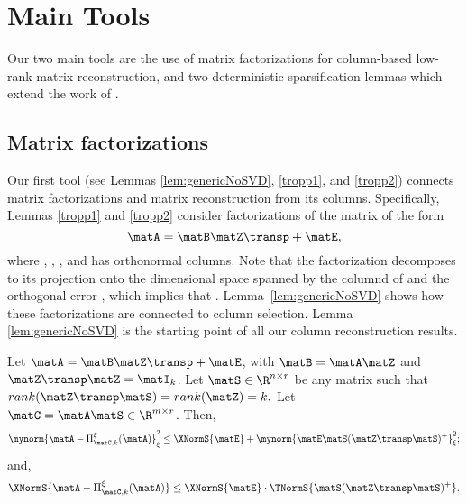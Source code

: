 \section{Main Tools}\label{sec:main1}
Our two main tools are the use of matrix factorizations for
column-based low-rank matrix reconstruction, and two
deterministic sparsification lemmas which extend the work of
\cite{BSS09}.

\subsection{Matrix factorizations}\label{sec:generic}

Our first tool (see Lemmas \ref{lem:genericNoSVD}, \ref{tropp1}, and \ref{tropp2}) connects matrix factorizations and matrix reconstruction from its columns.
Specifically, Lemmas \ref{tropp1} and \ref{tropp2} consider factorizations of
the matrix  of the form
$$\matA=\matB\matZ\transp+\matE,$$
where
,
, ,
and \math{\matZ} has orthonormal columns.
Note that the factorization decomposes \math{\matA} to its projection
\math{\matA\matZ\matZ\transp} onto the  dimensional space
spanned by the columnd of \math{\matZ} and the
 orthogonal error \math{\matE=\matA(\matI-\matZ\matZ\transp)}, which implies
 that
.
Lemma~\ref{lem:genericNoSVD} shows how these
factorizations are connected to column selection.
Lemma \ref{lem:genericNoSVD} is the starting point of all our
column reconstruction results.
\begin{lemma}
\label{lem:genericNoSVD}
Let $\matA = \matB \matZ\transp + \matE$, with $\matB=\matA\matZ$ and $\matZ\transp\matZ=\matI_{k}$.
Let $\matS\in\R^{n\times r}$ be any matrix such that $rank(\matZ\transp \matS) =
rank(\matZ)=k.$
Let $\matC = \matA \matS \in \R^{m \times r}$. Then,
\begin{equation}\label{eqn1}
\mynorm{\matA - \Pi^{\xi}_{\matC,k}(\matA)}_\xi^2 \leq \XNormS{\matE} +
\mynorm{\matE\matS (\matZ\transp \matS)^+}_\xi^2;
\end{equation}
and,
\begin{equation}\label{eqn2}
\XNormS{\matA - \Pi^{\xi}_{\matC,k}(\matA)}
\leq \XNormS{\matE} \cdot \TNormS{ \matS (\matZ\transp \matS)^+}.
\end{equation}
\end{lemma}
